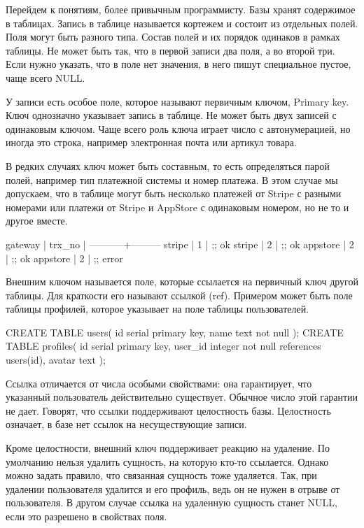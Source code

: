 Перейдем к понятиям, более привычным программисту. Базы хранят содержимое в таблицах. Запись в таблице называется кортежем и состоит из отдельных полей. Поля могут быть разного типа. Состав полей и их порядок одинаков в рамках таблицы. Не может быть так, что в первой записи два поля, а во второй три. Если нужно указать, что в поле нет значения, в него пишут специальное пустое, чаще всего NULL.

У записи есть особое поле, которое называют первичным ключом, Primary key. Ключ однозначно указывает запись в таблице. Не может быть двух записей с одинаковым ключом. Чаще всего роль ключа играет число с автонумерацией, но иногда это строка, например электронная почта или артикул товара.

В редких случаях ключ может быть составным, то есть определяться парой полей, например тип платежной системы и номер платежа. В этом случае мы допускаем, что в таблице могут быть несколько платежей от Stripe с разными номерами или платежи от Stripe и AppStore с одинаковым номером, но не то и другое вместе.

\begin{english}
  \begin{text}
 gateway   | trx_no |
-----------+---------
 stripe    | 1      | ;; ok
 stripe    | 2      | ;; ok
 appstore  | 2      | ;; ok
 appstore  | 2      | ;; error
  \end{text}
\end{english}

Внешним ключом называется поле, которые ссылается на первичный ключ другой таблицы. Для краткости его называют ссылкой (ref). Примером может быть поле  таблицы профилей, которое указывает на поле  таблицы пользователей.

\begin{english}
  \begin{sql}
CREATE TABLE users(
    id   serial primary key,
    name text not null
);
CREATE TABLE profiles(
    id      serial primary key,
    user_id integer not null references users(id),
    avatar  text
);
  \end{sql}
\end{english}

Ссылка отличается от числа особыми свойствами: она гарантирует, что указанный пользователь действительно существует. Обычное число этой гарантии не дает. Говорят, что ссылки поддерживают целостность базы. Целостность означает, в базе нет ссылок на несуществующие записи.

Кроме целостности, внешний ключ поддерживает реакцию на удаление. По умолчанию нельзя удалить сущность, на которую кто-то ссылается. Однако можно задать правило, что связанная сущность тоже удаляется. Так, при удалении пользователя удалится и его профиль, ведь он не нужен в отрыве от пользователя. В другом случае ссылка на удаленную сущность станет NULL, если это разрешено в свойствах поля.


